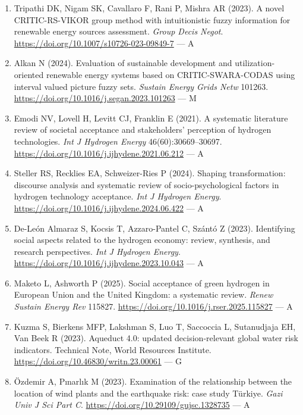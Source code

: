 \documentclass[11pt,a4paper]{article}
\begin{document}
\begin{enumerate}
  \item Tripathi DK, Nigam SK, Cavallaro F, Rani P, Mishra AR (2023). A novel CRITIC-RS-VIKOR group method with intuitionistic fuzzy information for renewable energy sources assessment. \textit{Group Decis Negot}. \url{https://doi.org/10.1007/s10726-023-09849-7} --- A

  \item Alkan N (2024). Evaluation of sustainable development and utilization-oriented renewable energy systems based on CRITIC-SWARA-CODAS using interval valued picture fuzzy sets. \textit{Sustain Energy Grids Netw} 101263. \url{https://doi.org/10.1016/j.segan.2023.101263} --- M

  \item Emodi NV, Lovell H, Levitt CJ, Franklin E (2021). A systematic literature review of societal acceptance and stakeholders' perception of hydrogen technologies. \textit{Int J Hydrogen Energy} 46(60):30669--30697. \url{https://doi.org/10.1016/j.ijhydene.2021.06.212} --- A

  \item Steller RS, Recklies EA, Schweizer-Ries P (2024). Shaping transformation: discourse analysis and systematic review of socio-psychological factors in hydrogen technology acceptance. \textit{Int J Hydrogen Energy}. \url{https://doi.org/10.1016/j.ijhydene.2024.06.422} --- A

  \item De-León Almaraz S, Kocsis T, Azzaro-Pantel C, Szántó Z (2023). Identifying social aspects related to the hydrogen economy: review, synthesis, and research perspectives. \textit{Int J Hydrogen Energy}. \url{https://doi.org/10.1016/j.ijhydene.2023.10.043} --- A

  \item Maketo L, Ashworth P (2025). Social acceptance of green hydrogen in European Union and the United Kingdom: a systematic review. \textit{Renew Sustain Energy Rev} 115827. \url{https://doi.org/10.1016/j.rser.2025.115827} --- A

  \item Kuzma S, Bierkens MFP, Lakshman S, Luo T, Saccoccia L, Sutanudjaja EH, Van Beek R (2023). Aqueduct 4.0: updated decision-relevant global water risk indicators. Technical Note, World Resources Institute. \url{https://doi.org/10.46830/writn.23.00061} --- G

  \item Özdemir A, Pınarlık M (2023). Examination of the relationship between the location of wind plants and the earthquake risk: case study Türkiye. \textit{Gazi Univ J Sci Part C}. \url{https://doi.org/10.29109/gujsc.1328735} --- A


\end{enumerate}
\end{document}
